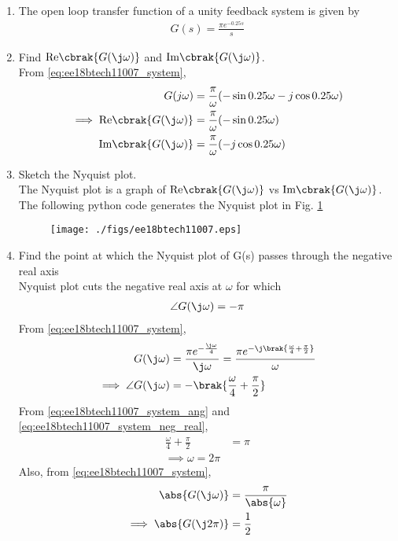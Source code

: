 \begin{enumerate}[label=\thesection.\arabic*.,ref=\thesection.\theenumi]
\item The open loop transfer function of a unity feedback system is given by
\begin{align}
\label{eq:ee18btech11007_system}
 G(s)=\frac{\pi e^{-0.25s}}{s}
\end{align}
\item Find $\text{Re} \cbrak{G(\j \omega)}$ and $\text{Im} \cbrak{G(\j \omega)}$.
\\
\solution From \eqref{eq:ee18btech11007_system},
%
\begin{align}
G(j\omega)&=\frac{\pi}{\omega}(-\sin{0.25\omega}-j\cos{0.25\omega})
\\
\implies  \text{Re} \cbrak{G(\j \omega)}&=\frac{\pi}{\omega}(-\sin{0.25\omega}) 
\\
 \text{Im} \cbrak{G(\j \omega)}&=\frac{\pi}{\omega}(-j\cos{0.25\omega}) 
\end{align}
%
\item Sketch the Nyquist plot.
\\
\solution The Nyquist plot is a graph of $\text{Re} \cbrak{G(\j \omega)}$  vs $\text{Im} \cbrak{G(\j \omega)}$.
The following python code generates the Nyquist plot in Fig.  \ref{fig:ee18btech11007}
%
\begin{figure}[!h]
  \texttt{[image: ./figs/ee18btech11007.eps]}
  \caption{}
  \label{fig:ee18btech11007}
\end{figure}
%
\item Find the point at which the Nyquist plot of G(s) passes through the negative real axis
\\
\solution  Nyquist plot cuts the negative real axis at $\omega $ for which 
\begin{align}
\angle G(\j\omega)=-\pi
\label{eq:ee18btech11007_system_neg_real}
\end{align}
From \eqref{eq:ee18btech11007_system},
\begin{align}
 G(\j\omega)&=\frac{\pi e^{-\frac{\j\omega}{4}}}{\j\omega} = \frac{\pi e^{-\j\brak{\frac{\omega}{4}+\frac{\pi}{2}}}}{\omega}
\\
\implies \angle{ G(\j\omega)} &= -\brak{\frac{\omega}{4}+\frac{\pi}{2}}
\label{eq:ee18btech11007_system_ang}
\end{align}
From \eqref{eq:ee18btech11007_system_ang} and \eqref{eq:ee18btech11007_system_neg_real}, 
\begin{align}
\frac{\omega}{4}+\frac{\pi}{2} &= \pi
\\
\implies \omega = 2\pi
\end{align}
Also, from \eqref{eq:ee18btech11007_system},
\begin{align}
\label{eq:ee18btech11007_system_mod}
\abs{ G(\j\omega)}&=\frac{\pi }{\abs{\omega}}
\\
\implies \abs{ G(\j2\pi)} &= \frac{1}{2}
\end{align}
%


\end{enumerate}

